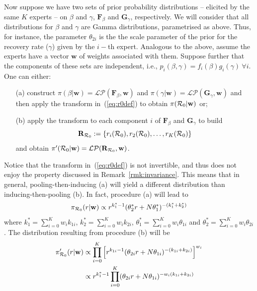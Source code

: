 \documentclass[11pt]{article}
\begin{document}
Now suppose we have two sets of prior probability distributions -- elicited by the same $K$ experts -- on $\beta$ and $\gamma$, $\mathbf{F}_\beta$ and $\mathbf{G}_\gamma$, respectively.
We will consider that all distributions for $\beta$ and $\gamma$ are Gamma distributions, parametrised as above.
Thus, for instance, the parameter $\theta_{2i}$ is the the scale parameter of the prior for the recovery rate ($\gamma$) given by the $i-$th expert.
Analogous to the above, assume the experts have a vector $\mathbf{w}$ of weights associated with them.
Suppose further that the components of these sets are independent, i.e., $p_i(\beta, \gamma) = f_i(\beta)g_i(\gamma)\: \forall i$.
One can either:
\begin{itemize}
 \item[(a)] construct $\pi(\beta | \mathbf{w}) = \mathcal{LP}(\mathbf{F}_\beta, \mathbf{w})$ and $\pi(\gamma | \mathbf{w}) = \mathcal{LP}(\mathbf{G}_\gamma, \mathbf{w})$ and then apply the transform in~(\ref{eq:r0def}) to obtain $\pi({\cal R}_0| \mathbf{w})$ or;
 \item[(b)] apply the transform to each component $i$ of $\mathbf{F}_\beta$ and $\mathbf{G}_\gamma$ to build
 \[\mathbf{R}_{{\cal R}_0}:= \{r_i({\cal R}_0), r_2({\cal R}_0), \ldots, r_K({\cal R}_0)\} \]
 and obtain $\pi^{\prime}({\cal R}_0|  \mathbf{w}) = \mathcal{LP}(\mathbf{R}_{{\cal R}_0},  \mathbf{w})$.
\end{itemize}
Notice that the transform in~(\ref{eq:r0def}) is not invertible, and thus does not enjoy the property discussed in Remark~\ref{rmk:invariance}.
This means that in general, pooling-then-inducing (a) will yield a different distribution than inducing-then-pooling (b).
In fact, procedure (a) will lead to
\begin{equation}
 \pi_{{\cal R}_0}(r| \mathbf{w}) \propto   r^{k_{1}^{\ast}-1} (\theta_{2}^{\ast} r + N\theta_{1}^{\ast})^{-(k_{1}^{\ast} + k_{2}^{\ast})}
\end{equation}
where $k_{1}^{\ast} = \sum_{i=0}^K w_ik_{1i}$,  $k_{2}^{\ast} = \sum_{i=0}^K w_ik_{2i}$,  $\theta_{1}^{\ast} = \sum_{i=0}^K w_i\theta_{1i}$ and  $\theta_{2}^{\ast} = \sum_{i=0}^K w_i\theta_{2i}$.
The distribution resulting from procedure (b) will be 
\begin{align}
  \pi^{\prime}_{{\cal R}_0}(r| \mathbf{w}) &\propto   \prod_{i=0}^K \left[ r^{k_{1i}-1} (\theta_{2i} r + N\theta_{1i})^{-(k_{1i} + k_{2i})} \right]^{w_i} \\
   &\propto r^{k_{1}^{\ast}-1}  \prod_{i=0}^K (\theta_{2i} r + N\theta_{1i})^{-w_{i}(k_{1i} + k_{2i})}
\end{align}
\end{document}
